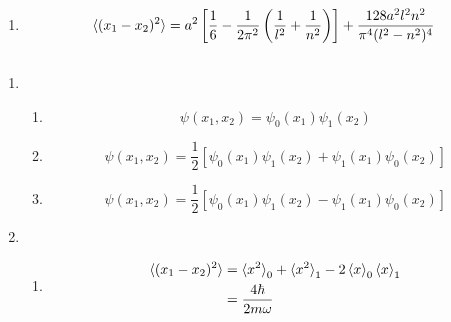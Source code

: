 \documentclass{article}
\begin{document}
\begin{enumerate}
  \item

        \[\braket{(x_1 - x_2)^2} = a^2 \left[ \frac{1}{6} - \frac{1}{2 \pi^2} \left( \frac{1}{l^2} + \frac{1}{n^2} \right) \right] + \frac{128 a^2 l^2 n^2}{\pi^4 (l^2 - n^2)^4}\]
\end{enumerate}

\subsection{}

\begin{enumerate}
  \item

        \begin{enumerate}
          \item \[\psi(x_1, x_2) = \psi_0(x_1) \psi_1(x_2)\]

          \item \[\psi(x_1, x_2) = \frac{1}{2} [\psi_0(x_1) \psi_1(x_2) + \psi_1(x_1) \psi_0(x_2)]\]

          \item \[\psi(x_1, x_2) = \frac{1}{2} [\psi_0(x_1) \psi_1(x_2) - \psi_1(x_1) \psi_0(x_2)]\]
        \end{enumerate}

  \item

        \begin{enumerate}
          \item

                \begin{align*}
                  \braket{(x_1 - x_2)^2} & = \braket{x^2}_0 + \braket{x^2}_1 - 2 \braket{x}_0 \braket{x}_1 \\
                                         & = \frac{4 \hbar}{2 m \omega}                                    \\
                \end{align*}
        \end{enumerate}
\end{enumerate}

\subsection{}
\end{document}

